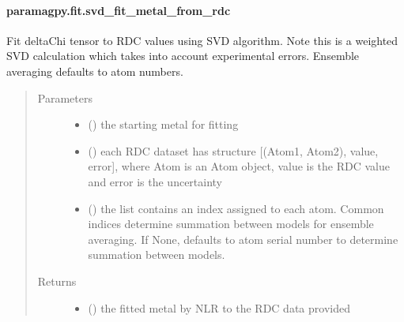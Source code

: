 \documentclass[a4paper,10pt,english,openany,oneside]{sphinxmanual}
\begin{document}
\paragraph{paramagpy.fit.svd\_fit\_metal\_from\_rdc}
\label{\detokenize{reference/generated/paramagpy.fit.svd_fit_metal_from_rdc:paramagpy-fit-svd-fit-metal-from-rdc}}\label{\detokenize{reference/generated/paramagpy.fit.svd_fit_metal_from_rdc::doc}}

\begin{fulllineitems}
\label{\detokenize{reference/generated/paramagpy.fit.svd_fit_metal_from_rdc:paramagpy.fit.svd_fit_metal_from_rdc}}
Fit deltaChi tensor to RDC values using SVD algorithm.
Note this is a weighted SVD calculation which takes into account
experimental errors.
Ensemble averaging defaults to atom numbers.
\begin{quote}\begin{description}
\item[{Parameters}] \leavevmode\begin{itemize}
\item {} 
 () \textendash{} the starting metal for fitting

\item {} 
 () \textendash{} each RDC dataset has structure {[}(Atom1, Atom2), value, error{]},
where Atom is an Atom object, value is the RDC value
and error is the uncertainty

\item {} 
 (\sphinxstyleliteralemphasis{\sphinxupquote{, }}) \textendash{} the list contains an index assigned to each atom.
Common indices determine summation between models
for ensemble averaging.
If None, defaults to atom serial number to determine summation
between models.

\end{itemize}

\item[{Returns}] \leavevmode
\begin{itemize}
\item {} 
 () \textendash{} the fitted metal by NLR to the RDC data provided


\end{itemize}
\end{description}
\end{quote}
\end{fulllineitems}
\end{document}
